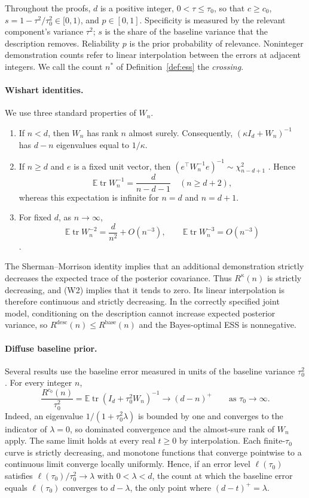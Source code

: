 \documentclass{article}
\theoremstyle{definition}
\newcommand{\E}{\mathbb{E}}
\begin{document}
Throughout the proofs, $d$ is a positive integer, $0<\tau\le\tau_0$, so that $c\ge c_0$, $s=1-\tau^2/\tau_0^2\in[0,1)$, and $p\in[0,1]$. Specificity is measured by the relevant component's variance $\tau^2$; $s$ is the share of the baseline variance that the description removes. Reliability $p$ is the prior probability of relevance. Noninteger demonstration counts refer to linear interpolation between the errors at adjacent integers. We call the count $n^*$ of Definition~\ref{def:ess} the \emph{crossing}.

\paragraph{Wishart identities.}
We use three standard properties of $W_n$.
\begin{enumerate}[label=(W\arabic*),leftmargin=*]
    \item If $n<d$, then $W_n$ has rank $n$ almost surely. Consequently, $(\kappa I_d+W_n)^{-1}$ has $d-n$ eigenvalues equal to $1/\kappa$.
    \item If $n\ge d$ and $e$ is a fixed unit vector, then $(e^\top W_n^{-1}e)^{-1}\sim\chi^2_{n-d+1}$ \citep[Theorem~3.2.12]{muirhead1982}. Hence
    \[
    \E\operatorname{tr}W_n^{-1}=\frac{d}{n-d-1}\quad(n\ge d+2),
    \]
    whereas this expectation is infinite for $n=d$ and $n=d+1$.
    \item For fixed $d$, as $n\to\infty$,
    \[
    \E\operatorname{tr}W_n^{-2}=\frac{d}{n^2}+O(n^{-3}),
    \qquad
    \E\operatorname{tr}W_n^{-3}=O(n^{-3})
    \]
    \citep{vonrosen1988}.
\end{enumerate}
The Sherman--Morrison identity implies that an additional demonstration strictly decreases the expected trace of the posterior covariance. Thus $R^\kappa(n)$ is strictly decreasing, and (W2) implies that it tends to zero. Its linear interpolation is therefore continuous and strictly decreasing. In the correctly specified joint model, conditioning on the description cannot increase expected posterior variance, so $R^{\mathrm{desc}}(n)\le R^{\mathrm{base}}(n)$ and the Bayes-optimal ESS is nonnegative.

\paragraph{Diffuse baseline prior.}
Several results use the baseline error measured in units of the baseline variance $\tau_0^2$. For every integer $n$,
\[
\frac{R^{c_0}(n)}{\tau_0^2}
=\E\operatorname{tr}(I_d+\tau_0^2W_n)^{-1}
\longrightarrow(d-n)^+
\qquad\text{as }\tau_0\to\infty.
\]
Indeed, an eigenvalue $1/(1+\tau_0^2\lambda)$ is bounded by one and converges to the indicator of $\lambda=0$, so dominated convergence and the almost-sure rank of $W_n$ apply. The same limit holds at every real $t\ge0$ by interpolation. Each finite-$\tau_0$ curve is strictly decreasing, and monotone functions that converge pointwise to a continuous limit converge locally uniformly. Hence, if an error level $\ell(\tau_0)$ satisfies $\ell(\tau_0)/\tau_0^2\to\lambda$ with $0<\lambda<d$, the count at which the baseline error equals $\ell(\tau_0)$ converges to $d-\lambda$, the only point where $(d-t)^+=\lambda$.
\end{document}

